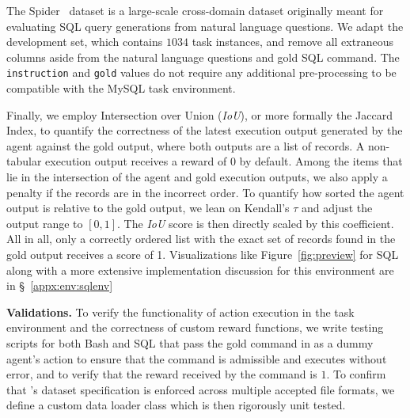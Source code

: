 The Spider~\cite{yu-etal-2018-spider} dataset is a large-scale cross-domain dataset originally meant for evaluating SQL query generations from natural language questions. We adapt the development set, which contains $1034$ task instances, and remove all extraneous columns aside from the natural language questions and gold SQL command. The \texttt{instruction} and \texttt{gold} values do not require any additional pre-processing to be compatible with the MySQL task environment.

Finally, we employ Intersection over Union (\textit{IoU}), or more formally the Jaccard Index, to quantify the correctness of the latest execution output generated by the agent against the gold output, where both outputs are a list of records.
A non-tabular execution output receives a reward of 0 by default.
Among the items that lie in the intersection of the agent and gold execution outputs, we also apply a penalty if the records are in the incorrect order.
To quantify how sorted the agent output is relative to the gold output, we lean on Kendall’s $\tau$ and adjust the output range to $[0, 1]$. The \textit{IoU} score is then directly scaled by this coefficient. All in all, only a correctly ordered list with the exact set of records found in the gold output receives a score of 1.
Visualizations like Figure~\ref{fig:preview} for SQL along with a more extensive implementation discussion for this environment are in \S~\ref{appx:env:sqlenv}

\textbf{Validations.}
To verify the functionality of action execution in the task environment and the correctness of custom reward functions, we write testing scripts for both Bash and SQL that pass the gold command in as a dummy agent's action to ensure that the command is admissible and executes without error, and to verify that the reward received by the command is $1$.
To confirm that \benchmark{}'s dataset specification is enforced across multiple accepted file formats, we define a custom \benchmark{} data loader class which is then rigorously unit tested.

